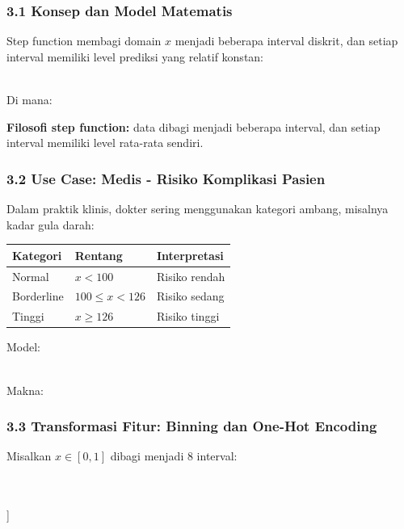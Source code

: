 \documentclass[12pt,a4paper]{article}
\begin{document}
\subsubsection{3.1 Konsep dan Model Matematis}

Step function membagi domain $x$ menjadi beberapa interval diskrit, dan setiap interval memiliki level prediksi yang relatif konstan:


\\[
\hat{y}(x) = \beta_0 + \sum_{m=1}^{M} \beta_m \mathbb{I}(c_{m-1} \leq x < c_m)
\\]


Di mana:


\textbf{Filosofi step function:} data dibagi menjadi beberapa interval, dan setiap interval memiliki level rata-rata sendiri.


\subsubsection{3.2 Use Case: Medis - Risiko Komplikasi Pasien}

Dalam praktik klinis, dokter sering menggunakan kategori ambang, misalnya kadar gula darah:


\begin{tabular}{|l|l|l|}
\hline
Kategori & Rentang & Interpretasi \\
\hline
Normal & $x < 100$ & Risiko rendah \\
\hline
Borderline & $100 \leq x < 126$ & Risiko sedang \\
\hline
Tinggi & $x \geq 126$ & Risiko tinggi \\
\hline
\end{tabular}


Model:


\\[
\hat{y} = \beta_0 + \beta_1 \mathbb{I}(x \in A_1) + \beta_2 \mathbb{I}(x \in A_2) + \beta_3 \mathbb{I}(x \in A_3)
\\]


Makna:


\subsubsection{3.3 Transformasi Fitur: Binning dan One-Hot Encoding}

Misalkan $x \in [0, 1]$ dibagi menjadi 8 interval:


\\[
A_1 = [0, 0.125), \quad A_2 = [0.125, 0.25), \quad \dots, \quad A_8 = [0.875, 1]
\\]
\end{document}
